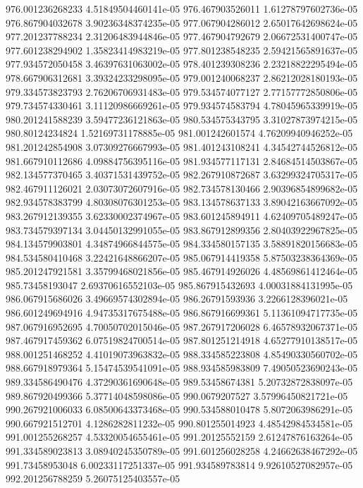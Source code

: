 {976.001236268233 4.51849504460141e-05
976.467903526011 1.61278797602736e-05
976.867904032678 3.90236348374235e-05
977.067904286012 2.65017642698624e-05
977.201237788234 2.31206483944846e-05
977.467904792679 2.06672531400747e-05
977.601238294902 1.35823414983219e-05
977.801238548235 2.59421565891637e-05
977.934572050458 3.46397631063002e-05
978.401239308236 2.23218822295494e-05
978.667906312681 3.39324233298095e-05
979.001240068237 2.86212028180193e-05
979.334573823793 2.76206706931483e-05
979.534574077127 2.77157772850806e-05
979.734574330461 3.11120986669261e-05
979.934574583794 4.78045965339919e-05
980.201241588239 3.59477236121863e-05
980.534575343795 3.31027873974215e-05
980.80124234824 1.52169731178885e-05
981.001242601574 4.76209940946252e-05
981.201242854908 3.07309276667993e-05
981.401243108241 4.34542744526812e-05
981.667910112686 4.09884756395116e-05
981.934577117131 2.84684514503867e-05
982.134577370465 3.40371531439752e-05
982.267910872687 3.63299324705317e-05
982.467911126021 2.03073072607916e-05
982.734578130466 2.90396854899682e-05
982.934578383799 4.80308076301253e-05
983.134578637133 3.89042163667092e-05
983.267912139355 3.62330002374967e-05
983.601245894911 4.62409705489247e-05
983.734579397134 3.04450132991055e-05
983.867912899356 2.80403922967825e-05
984.134579903801 4.34874966844575e-05
984.334580157135 3.58891820156683e-05
984.534580410468 3.22421648866207e-05
985.067914419358 5.87503238364369e-05
985.201247921581 3.35799468021856e-05
985.467914926026 4.48569861412464e-05
985.73458193047 2.69370616552103e-05
985.867915432693 4.00031884131995e-05
986.067915686026 3.49669574302894e-05
986.26791593936 3.2266128396021e-05
986.601249694916 4.94735317675488e-05
986.867916699361 5.11361094717735e-05
987.067916952695 4.70050702015046e-05
987.267917206028 6.46578932067371e-05
987.467917459362 6.07519824700514e-05
987.801251214918 4.65277910138517e-05
988.001251468252 4.41019073963832e-05
988.334585223808 4.85490330560702e-05
988.667918979364 5.15474539541091e-05
988.934585983809 7.49050523690243e-05
989.334586490476 4.37290361690648e-05
989.53458674381 5.20732872838097e-05
989.867920499366 5.37714048598086e-05
990.0679207527 3.57996450821721e-05
990.267921006033 6.08500643373468e-05
990.534588010478 5.8072063986291e-05
990.667921512701 4.1286282811232e-05
990.801255014923 4.48542984534581e-05
991.001255268257 4.53320054655461e-05
991.20125552159 2.61247876163264e-05
991.334589023813 3.08940245350789e-05
991.601256028258 4.24662638467292e-05
991.73458953048 6.00233117251337e-05
991.934589783814 9.92610527082957e-05
992.201256788259 5.26075125403557e-05
}
